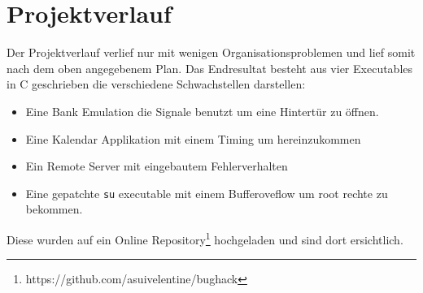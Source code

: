 \section{Projektverlauf}\label{projektverlauf}

Der Projektverlauf verlief nur mit wenigen Organisationsproblemen und
lief somit nach dem oben angegebenem Plan. Das Endresultat besteht aus
vier Executables in C geschrieben die verschiedene Schwachstellen
darstellen:

\begin{itemize}
\tightlist
\item
  Eine Bank Emulation die Signale benutzt um eine Hintertür zu öffnen.
\item
  Eine Kalendar Applikation mit einem Timing um hereinzukommen
\item
  Ein Remote Server mit eingebautem Fehlerverhalten
\item
  Eine gepatchte \texttt{su} executable mit einem Bufferoveflow um root
  rechte zu bekommen.
\end{itemize}

Diese wurden auf ein Online Repository\footnote{https://github.com/asuivelentine/bughack}
hochgeladen und sind dort ersichtlich.
